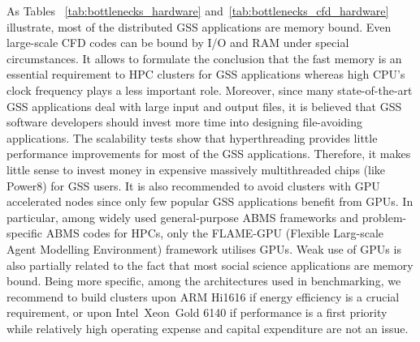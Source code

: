As Tables ~\ref{tab:bottlenecks_hardware} and~\ref{tab:bottlenecks_cfd_hardware} illustrate, most of the distributed GSS applications are memory bound. Even large-scale CFD codes can be bound by I/O and RAM under special circumstances. It allows to formulate the conclusion that the fast memory is an essential requirement to HPC clusters for GSS applications whereas high CPU's clock frequency plays a less important role. Moreover, since many state-of-the-art GSS applications deal with large input and output files, it is believed that GSS software developers should invest more time into designing file-avoiding applications. The scalability tests show that hyperthreading provides little performance improvements for most of the GSS applications. Therefore, it makes little sense to invest money in expensive massively multithreaded chips (like Power8) for GSS users. It is also recommended to avoid clusters with GPU accelerated nodes since only few popular GSS applications benefit from GPUs. In particular, among widely used general-purpose ABMS frameworks and problem-specific ABMS codes for HPCs, only the FLAME-GPU (Flexible Larg-scale Agent Modelling Environment) \cite{2011:flame_gpu,2018:flame_gpu} framework utilises GPUs. Weak use of GPUs is also partially related to the fact that most social science applications are memory bound. Being more specific, among the architectures used in benchmarking, we recommend to build clusters upon ARM Hi1616 if energy efficiency is a crucial requirement, or upon Intel\textregistered\ Xeon\textregistered\ Gold 6140 if performance is a first priority while relatively high operating expense and capital expenditure are not an issue.



